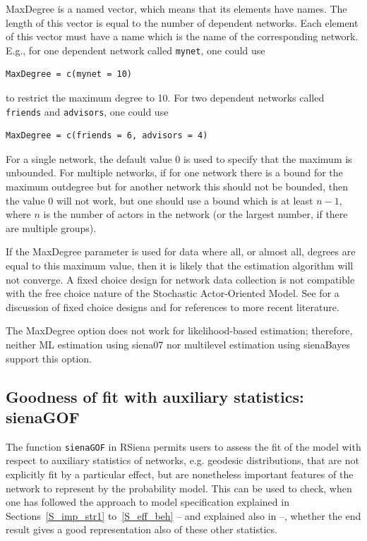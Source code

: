 \documentclass[a4paper,fleqn,11pt]{article}
\newcommand{\+}{\, + \,}
\newcommand{\RS}{{\sf \textsf{RSiena} }}
\newcommand{\saom}{{Stochastic Actor-Oriented Model}}
\begin{document}
\textsf{MaxDegree} is a named vector, which means that its elements
have names. The length of this vector
is equal to the number of dependent networks.
Each element of this vector must have a name
which is the name of the corresponding network.
E.g., for one dependent network called \texttt{mynet}, one could use
\begin{verbatim}
MaxDegree = c(mynet = 10)
\end{verbatim}
to restrict the maximum degree to 10.
For two dependent networks called \texttt{friends} and \texttt{advisors},
one could use
\begin{verbatim}
MaxDegree = c(friends = 6, advisors = 4)
\end{verbatim}

For a single network, the default value 0 is used
to specify that the maximum is unbounded.
For multiple networks, if for one network
there is a bound for the maximum outdegree
 but for another network this should not be bounded, then
 the value 0 will not work,
 but one should use a bound which is at least $n-1$,
where $n$ is the number of actors in the network (or the largest number,
if there are multiple groups).

If the \textsf{MaxDegree} parameter is used for data where
all, or almost all, degrees are equal to this maximum value,
then it is likely that the estimation algorithm will not converge.
A fixed choice design for network data collection is not
compatible with the free choice nature of the \saom.
See \citet{HollandLeinhardt1973} for a discussion of
fixed choice designs and \citet{Znidarsic2012}
for references to more recent literature.

The \textsf{MaxDegree} option does not work for likelihood-based
estimation; therefore, neither ML estimation using \textsf{siena07}
nor multilevel estimation using \textsf{sienaBayes} support
this option.


\subsection{Goodness of fit with auxiliary statistics: \textsf{sienaGOF}}
\label{S_gof}

The function  \verb!sienaGOF! in \RS permits users
to assess the fit of the model with respect to
auxiliary statistics of networks, e.g. geodesic distributions,
that are not explicitly fit by a particular effect,
but are nonetheless important features of the network to represent by the
probability model.
This can be used to check, when one has followed the approach to
model specification explained in Sections~\ref{S_imp_str1}
to~\ref{S_eff_beh} -- and explained also in \citet{SnijdersEA10b} --,
whether the end result gives a good representation
also of these other statistics.
\end{document}
